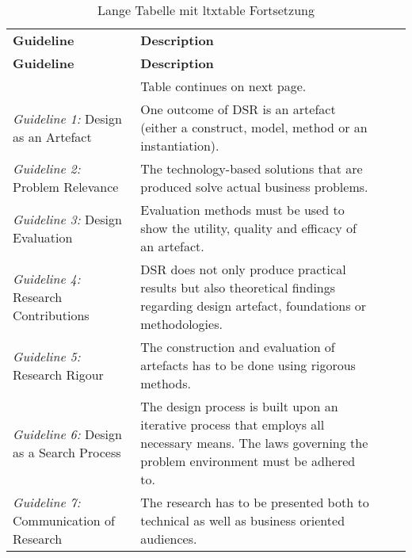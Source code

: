 \begin{longtable}{lXXX}
\vspace{0.25cm}\\
\toprule
\textbf{Guideline} & \textbf{Description} \\ 
\midrule
\endfirsthead
\toprule
\textbf{Guideline} & \textbf{Description} \\ 
\midrule
\endhead
\midrule
& \hspace*{\fill} \small{Table continues on next page.}
\endfoot
\bottomrule
\caption{Lange Tabelle mit ltxtable Fortsetzung}\\
\endlastfoot
\textit{Guideline 1:} Design as an Artefact & One outcome of \ac{DSR} is an artefact (either a construct, model, method or an instantiation). \\
\textit{Guideline 2:} Problem Relevance & The technology-based solutions that are produced solve actual business problems. \\
\textit{Guideline 3:} Design Evaluation & Evaluation methods must be used to show the utility, quality and efficacy of an artefact. \\
\textit{Guideline 4:} Research Contributions & \ac{DSR} does not only produce practical results but also theoretical findings regarding design artefact, foundations or methodologies. \\
\textit{Guideline 5:} Research Rigour & The construction and evaluation of artefacts has to be done using rigorous methods. \\
\textit{Guideline 6:} Design as a Search Process & The design process is built upon an iterative process that employs all necessary means. The laws governing the problem environment must be adhered to.\\
\textit{Guideline 7:} Communication of Research & The research has to be presented both to technical as well as business oriented audiences. \\
\end{longtable}
